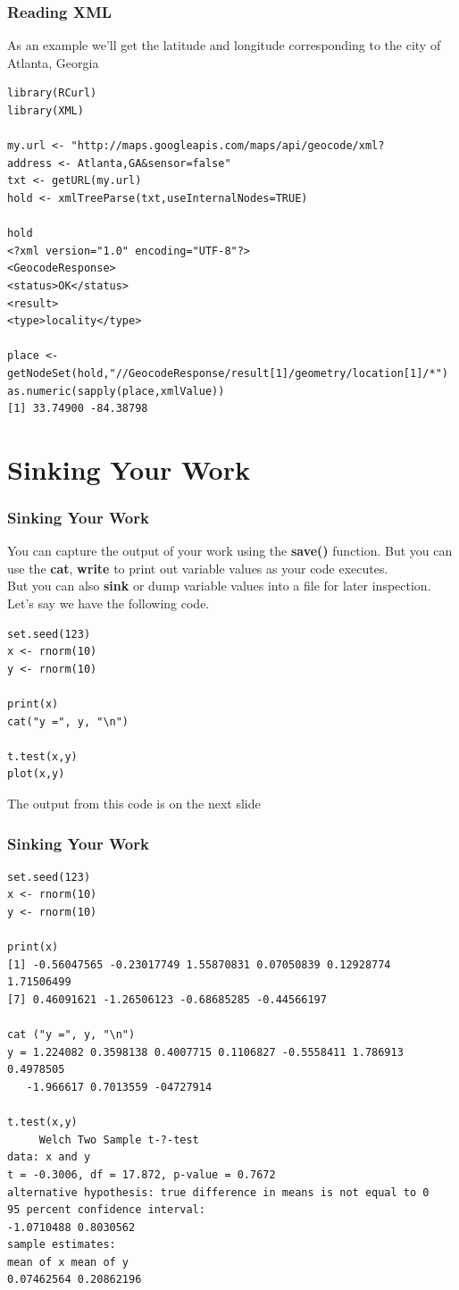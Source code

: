 \documentclass{beamer}
\begin{document}
\begin{frame}[fragile]
\frametitle{Reading XML}
As an example we'll get the latitude and longitude corresponding to the city of Atlanta, Georgia 
\scriptsize
\begin{verbatim}
library(RCurl)
library(XML)

my.url <- "http://maps.googleapis.com/maps/api/geocode/xml?
address <- Atlanta,GA&sensor=false"
txt <- getURL(my.url)
hold <- xmlTreeParse(txt,useInternalNodes=TRUE)

hold
<?xml version="1.0" encoding="UTF-8"?>
<GeocodeResponse>
<status>OK</status>
<result>
<type>locality</type>

place <- getNodeSet(hold,"//GeocodeResponse/result[1]/geometry/location[1]/*")
as.numeric(sapply(place,xmlValue))
[1] 33.74900 -84.38798
\end{verbatim}
\end{frame}



\section{Sinking Your Work}

\begin{frame}[fragile]
\frametitle{Sinking Your Work}
\small
You can capture the output of your work using the \textbf{save()} function. But you can use the \textbf{cat}, \textbf{write} to print out variable values as your code executes. 
\newline
\\
But you can also \textbf{sink} or dump variable values into a file for later inspection. Let's say we have the following code.

\begin{verbatim}
set.seed(123)
x <- rnorm(10)
y <- rnorm(10)

print(x)
cat("y =", y, "\n")

t.test(x,y)
plot(x,y)
\end{verbatim}
The output from this code is on the next slide
\end{frame}


\begin{frame}[fragile]
\frametitle{Sinking Your Work}

\scriptsize
\begin{verbatim}
set.seed(123)
x <- rnorm(10)
y <- rnorm(10)

print(x)
[1] -0.56047565 -0.23017749 1.55870831 0.07050839 0.12928774 1.71506499
[7] 0.46091621 -1.26506123 -0.68685285 ‐0.44566197

cat ("y =", y, "\n")
y = 1.224082 0.3598138 0.4007715 0.1106827 ‐0.5558411 1.786913 0.4978505 
   -1.966617 0.7013559 -04727914

t.test(x,y)
     Welch Two Sample t-?‐test
data: x and y
t = -0.3006, df = 17.872, p-value = 0.7672
alternative hypothesis: true difference in means is not equal to 0
95 percent confidence interval:
-1.0710488 0.8030562
sample estimates:
mean of x mean of y
0.07462564 0.20862196
\end{verbatim}

\end{frame}
\end{document}
